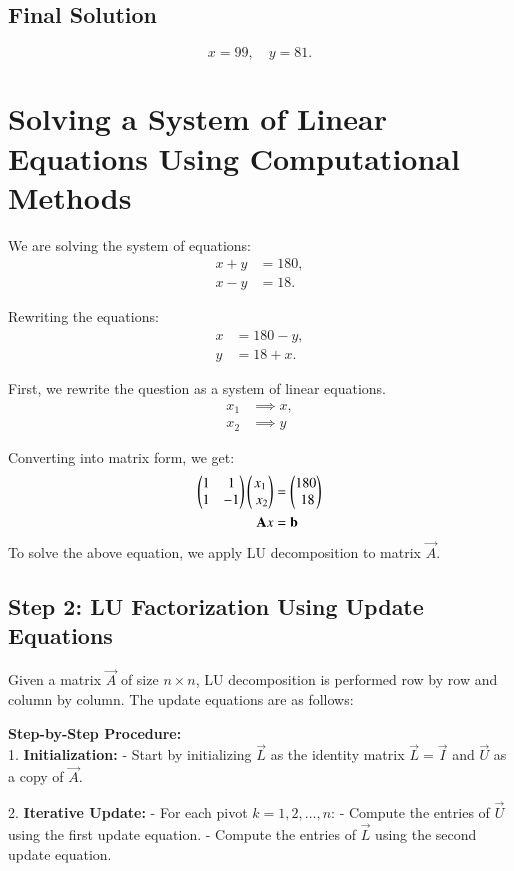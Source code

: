 \documentclass[journal]{IEEEtran}
\begin{document}
\subsection*{Final Solution}
\[\boxed{x = 99, \quad y = 81.}\]

\section*{Solving a System of Linear Equations Using Computational Methods}

We are solving the system of equations:
\begin{align}
x + y &= 180, \\
x - y &= 18.
\end{align}

Rewriting the equations:
\begin{align}
x &= 180 - y, \\
y &= 18 + x.
\end{align}

First, we rewrite the question as a system of linear equations.
\begin{align}
    x_1 &\implies x, \\
    x_2 &\implies y
\end{align}

Converting into matrix form, we get:
\begin{align}
    \begin{pmatrix}1 & 1\\ 1 & -1\end{pmatrix}\begin{pmatrix}x_1 \\\ x_2\end{pmatrix} &= \begin{pmatrix}180 \\\ 18\end{pmatrix} \\
    \mathbf{A}x &= \mathbf{b}
\end{align}
To solve the above equation, we apply LU decomposition to matrix \(\vec{A}\).

\subsection*{Step 2: LU Factorization Using Update Equations}
Given a matrix $\vec{A}$ of size $n \times n$, LU decomposition is performed row by row and column by column. The update equations are as follows:

\textbf{Step-by-Step Procedure:}\\
1. \textbf{Initialization:}  
   - Start by initializing $\vec{L}$ as the identity matrix $\vec{L} = \vec{I}$ and $\vec{U}$ as a copy of $\vec{A}$.

2. \textbf{Iterative Update:}  
   - For each pivot $k = 1, 2, \ldots, n$:  
     - Compute the entries of $\vec{U}$ using the first update equation.  
     - Compute the entries of $\vec{L}$ using the second update equation.  
\end{document}
